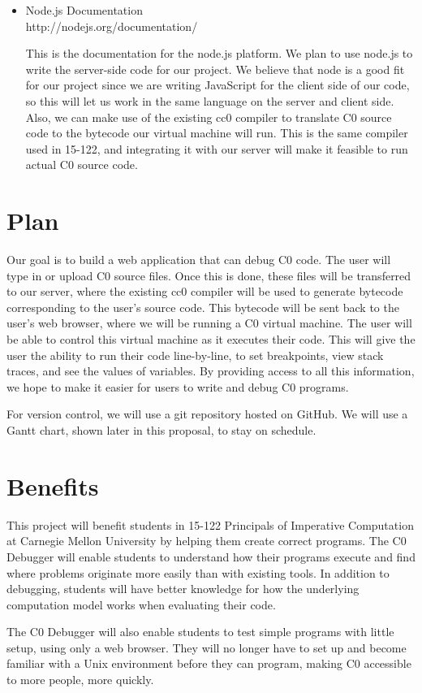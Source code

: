 \documentclass[11pt]{article}
\begin{document}
\begin{itemize}
\item Node.js Documentation\\
  http://nodejs.org/documentation/
  \par
  This is the documentation for the node.js platform.  We plan to use
  node.js to write the server-side code for our project.  We believe
  that node is a good fit for our project since we are writing
  JavaScript for the client side of our code, so this will let us work
  in the same language on the server and client side.  Also, we can
  make use of the existing cc0 compiler to translate C0 source code to
  the bytecode our virtual machine will run. This is the same compiler
  used in 15-122, and integrating it with our server will make it
  feasible to run actual C0 source code.
\end{itemize}
\section{Plan}
\par
Our goal is to build a web application that can debug C0 code.
The user will type in or upload C0 source files.
Once this is done, these files will be transferred to our server,
where the existing cc0 compiler will be used to
generate bytecode corresponding to the user's source code.
This bytecode will be sent back to the user's web browser,
where we will be running a C0 virtual machine.
The user will be able to control this virtual machine as it executes their code. 
This will give the user the ability to run their code line-by-line,
to set breakpoints, view stack traces, and see the values of variables.
By providing access to all this information,
we hope to make it easier for users to write and debug C0 programs.
\par
For version control, we will use a git repository hosted on GitHub. 
We will use a Gantt chart, shown later in this proposal, to stay on schedule.


\section{Benefits}
\par
This project will benefit students in 15-122 Principals of Imperative
Computation at Carnegie Mellon University by helping them create correct
programs. The C0 Debugger will enable students to understand how their programs
execute and find where problems originate more easily than with existing tools.
In addition to debugging, students will have better knowledge for how the
underlying computation model works when evaluating their code.
\par
The C0 Debugger will also enable students to test simple programs with little
setup, using only a web browser. They will no longer have to set up and become
familiar with a Unix environment before they can program, making C0 accessible
to more people, more quickly.
\end{document}
